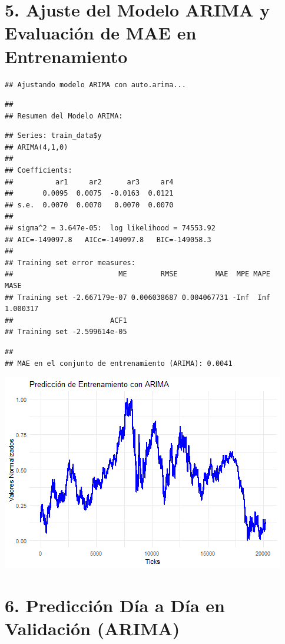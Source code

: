\documentclass[
]{book}
\begin{document}
\section{5. Ajuste del Modelo ARIMA y Evaluación de MAE en Entrenamiento}\label{ajuste-del-modelo-arima-y-evaluaciuxf3n-de-mae-en-entrenamiento}

\begin{verbatim}
## Ajustando modelo ARIMA con auto.arima...
\end{verbatim}

\begin{verbatim}
## 
## Resumen del Modelo ARIMA:
\end{verbatim}

\begin{verbatim}
## Series: train_data$y 
## ARIMA(4,1,0) 
## 
## Coefficients:
##          ar1     ar2      ar3     ar4
##       0.0095  0.0075  -0.0163  0.0121
## s.e.  0.0070  0.0070   0.0070  0.0070
## 
## sigma^2 = 3.647e-05:  log likelihood = 74553.92
## AIC=-149097.8   AICc=-149097.8   BIC=-149058.3
## 
## Training set error measures:
##                         ME        RMSE         MAE  MPE MAPE     MASE
## Training set -2.667179e-07 0.006038687 0.004067731 -Inf  Inf 1.000317
##                       ACF1
## Training set -2.599614e-05
\end{verbatim}

\begin{verbatim}
## 
## MAE en el conjunto de entrenamiento (ARIMA): 0.0041
\end{verbatim}

\includegraphics{bookdown_time_series_files/figure-latex/unnamed-chunk-15-1.png}

\section{6. Predicción Día a Día en Validación (ARIMA)}\label{predicciuxf3n-duxeda-a-duxeda-en-validaciuxf3n-arima}
\end{document}
